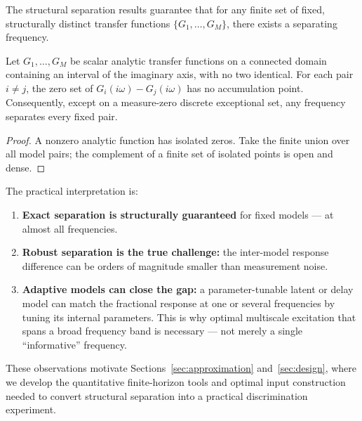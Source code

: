 The structural separation results guarantee that for any finite set of fixed, structurally distinct transfer functions \(\{G_1, \dots, G_M\}\), there exists a separating frequency.

\begin{theorem}
\label{thm:T7}
Let \(G_1, \dots, G_M\) be scalar analytic transfer functions on a connected domain containing an interval of the imaginary axis, with no two identical. For each pair \(i \ne j\), the zero set of \(G_i(i\omega) - G_j(i\omega)\) has no accumulation point. Consequently, except on a measure-zero discrete exceptional set, any frequency separates every fixed pair.
\end{theorem}

\begin{proof}
A nonzero analytic function has isolated zeros. Take the finite union over all model pairs; the complement of a finite set of isolated points is open and dense.
\end{proof}

The practical interpretation is:
\begin{enumerate}
    \item \textbf{Exact separation is structurally guaranteed} for fixed models --- at almost all frequencies.
    \item \textbf{Robust separation is the true challenge:} the inter-model response difference can be orders of magnitude smaller than measurement noise.
    \item \textbf{Adaptive models can close the gap:} a parameter-tunable latent or delay model can match the fractional response at one or several frequencies by tuning its internal parameters. This is why optimal multiscale excitation that spans a broad frequency band is necessary --- not merely a single ``informative'' frequency.
\end{enumerate}

These observations motivate Sections~\ref{sec:approximation} and~\ref{sec:design}, where we develop the quantitative finite-horizon tools and optimal input construction needed to convert structural separation into a practical discrimination experiment.